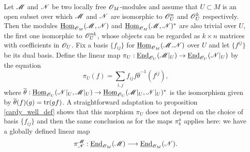 Let $\mathscr{M}$ and $\mathscr{N}$ be two locally free $\mathscr{O}_M$-modules and assume that $U\subset M$ is an open subset over which $\mathscr{M}$ and $\mathscr{N}$ are isomorphic to $\mathscr{O}^n_U$ and $\mathscr{O}^k_U$ respectively. Then the modules $\underline{\operatorname{Hom}}_{\mathscr{O}_M}(\mathscr{M},\mathscr{N})$ and $\underline{\operatorname{Hom}}_{\mathscr{O}_M}(\mathscr{M},\mathscr{N})^*$ are also trivial over $U$, the first one isomorphic to $\mathscr{O}^{nk}_U$, whose objects can be regarded as $k\times n$ matrices with coefficients in $\mathscr{O}_U$. Fix a basis $\{f_{ij}\}$ for $\underline{\operatorname{Hom}}_{\mathscr{O}_M}(\mathscr{M}.\mathscr{N})$ over $U$ and let $\{f^{ij}\}$ be its dual basis. Define the linear map $\pi_U:\underline{\operatorname{End}}_{\mathscr{O}_U}(\mathscr{M}|_U)\to \underline{\operatorname{End}}_{\mathscr{O}_U}(\mathscr{N}|_U)$ by the equation
$$\pi_U(f)=\sum_{i,j}f_{ij}f\overline{\theta}^{-1}(f^{ij}),$$
where $\overline{\theta}:\underline{\operatorname{Hom}}_{\mathscr{O}_U}(\mathscr{N}|_U,\mathscr{M}|_U)\to \underline{\operatorname{Hom}}_{\mathscr{O}_U}(\mathscr{M}|_U,\mathscr{N}|_U)^*$ is the isomorphism given by $\overline{\theta}(f)(g)=\operatorname{tr}(gf)$. A straightforward adaptation to proposition \ref{cardy_well_def} shows that this morphism $\pi_U$ does not depend on the choice of basis $\{f_{ij}\}$ and then the same conclusion as for the maps $\pi^a_b$ applies here: we have a globally defined linear map
$$\pi^{\mathscr{M}}_{\mathscr{N}}:\underline{\operatorname{End}}_{\mathscr{O}_M}(\mathscr{M})\longrightarrow \underline{\operatorname{End}}_{\mathscr{O}_M}(\mathscr{N}).$$

